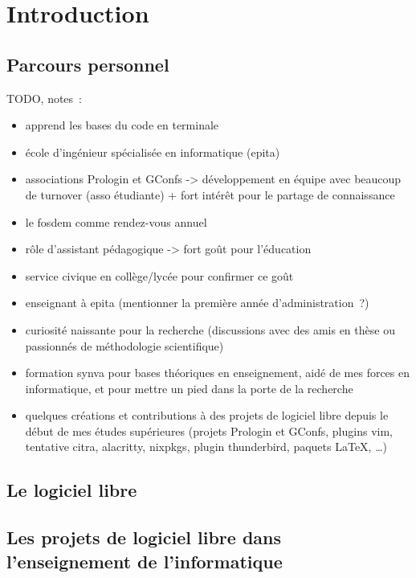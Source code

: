 \chapter{Introduction}

\section{Parcours personnel}

TODO, notes :

\begin{itemize}
    \item apprend les bases du code en terminale
    \item école d'ingénieur spécialisée en informatique (\gls{epita})
    \item associations Prologin et GConfs -> développement en équipe avec beaucoup de turnover (asso
        étudiante) + fort intérêt pour le partage de connaissance
    \item le \gls{fosdem} comme rendez-vous annuel
    \item rôle d'assistant pédagogique -> fort goût pour l'éducation
    \item service civique en collège/lycée pour confirmer ce goût
    \item enseignant à \gls{epita} (mentionner la première année d'administration ?)
    \item curiosité naissante pour la recherche (discussions avec des amis en thèse ou passionnés de
        méthodologie scientifique)
    \item formation \gls{synva} pour bases théoriques en enseignement, aidé de mes forces en informatique, et pour
        mettre un pied dans la porte de la recherche
    \item quelques créations et contributions à des projets de logiciel libre depuis le début de mes études
        supérieures (projets Prologin et GConfs, plugins vim, tentative citra, alacritty, nixpkgs, plugin
        thunderbird, paquets \LaTeX, \ldots)
\end{itemize}

\section{Le logiciel libre}


\section{Les projets de logiciel libre dans l'enseignement de l'informatique}

